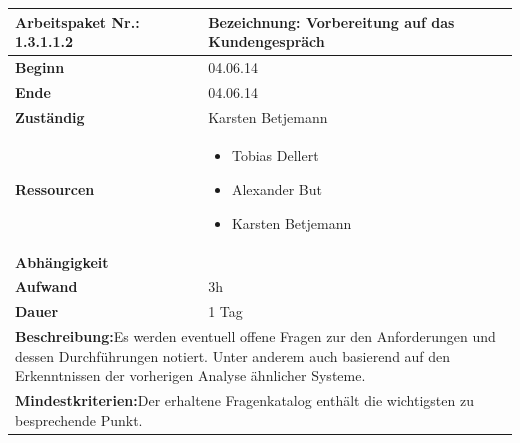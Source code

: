 \documentclass[fontsize=12pt,paper=a4,twoside]{scrartcl}
\begin{document}
\begin{tabular}{|p{5.3cm}|p{9.7cm}|}\hline
	\textbf{Arbeitspaket Nr.:} 1.3.1.1.2 & \textbf{Bezeichnung:} Vorbereitung auf das Kundengespräch\\ \hline \hline
	\textbf{Beginn} & 04.06.14\\ \hline
	\textbf{Ende} & 04.06.14\\ \hline
	\textbf{Zuständig} & Karsten Betjemann\\ \hline
	\textbf{Ressourcen} & \begin{itemize}
		\item Tobias Dellert
		\item Alexander But
		\item Karsten Betjemann
	\end{itemize}    \\ \hline
	\textbf{Abhängigkeit} &\\ \hline
	\textbf{Aufwand} & 3h\\ \hline
	\textbf{Dauer} & 1 Tag\\ \hline
	\multicolumn{2}{|p{15cm}|}{\textbf{Beschreibung:}\newline Es werden eventuell offene Fragen zur den Anforderungen und dessen Durchführungen notiert. Unter anderem auch  basierend auf den Erkenntnissen der vorherigen Analyse ähnlicher Systeme. }\\ \hline
	\multicolumn{2}{|p{15cm}|}{\textbf{Mindestkriterien:}\newline Der erhaltene Fragenkatalog enthält die wichtigsten zu besprechende Punkt. }\\ \hline
\end{tabular}

\begin{verbatim} 
\end{verbatim}
\end{document}
